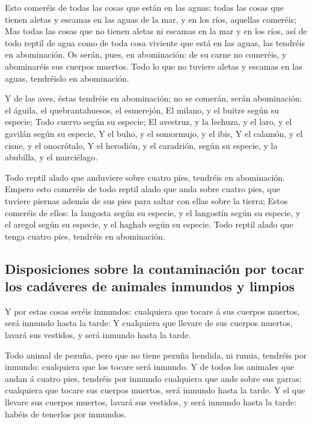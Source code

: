  Esto comeréis de todas las cosas que están en las aguas:
todas las cosas que tienen aletas y escamas en las aguas de la mar, y en
los ríos, aquellas comeréis;  Mas todas las cosas que no
tienen aletas ni escamas en la mar y en los ríos, así de todo reptil de
agua como de toda cosa viviente que está en las aguas, las tendréis en
abominación.  Os serán, pues, en abominación: de su carne
no comeréis, y abominaréis sus cuerpos muertos.  Todo lo
que no tuviere aletas y escamas en las aguas, tendréislo en abominación.

 Y de las aves, éstas tendréis en abominación; no se
comerán, serán abominación: el águila, el quebrantahuesos, el esmerejón,
 El milano, y el buitre según su especie; 
Todo cuervo según su especie;  El avestruz, y la lechuza, y
el laro, y el gavilán según su especie,  Y el buho, y el
somormujo, y el ibis,  Y el calamón, y el cisne, y el
onocrótalo,  Y el herodión, y el caradrión, según su
especie, y la abubilla, y el murciélago.

 Todo reptil alado que anduviere sobre cuatro pies,
tendréis en abominación.  Empero esto comeréis de todo
reptil alado que anda sobre cuatro pies, que tuviere piernas además de
sus pies para saltar con ellas sobre la tierra;  Estos
comeréis de ellos: la langosta según su especie, y el langostín según su
especie, y el aregol según su especie, y el haghab según su especie.
 Todo reptil alado que tenga cuatro pies, tendréis en
abominación.

\hypertarget{disposiciones-sobre-la-contaminaciuxf3n-por-tocar-los-caduxe1veres-de-animales-inmundos-y-limpios}{%
\subsection{Disposiciones sobre la contaminación por tocar los cadáveres
de animales inmundos y
limpios}\label{disposiciones-sobre-la-contaminaciuxf3n-por-tocar-los-caduxe1veres-de-animales-inmundos-y-limpios}}

 Y por estas cosas seréis inmundos: cualquiera que tocare á
sus cuerpos muertos, será inmundo hasta la tarde:  Y
cualquiera que llevare de sus cuerpos muertos, lavará sus vestidos, y
será inmundo hasta la tarde.

 Todo animal de pezuña, pero que no tiene pezuña hendida,
ni rumia, tendréis por inmundo: cualquiera que los tocare será inmundo.
 Y de todos los animales que andan á cuatro pies, tendréis
por inmundo cualquiera que ande sobre sus garras: cualquiera que tocare
sus cuerpos muertos, será inmundo hasta la tarde.  Y el que
llevare sus cuerpos muertos, lavará sus vestidos, y será inmundo hasta
la tarde: habéis de tenerlos por inmundos.

